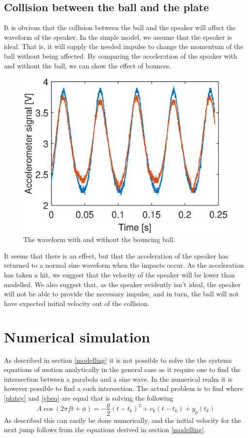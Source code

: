 \documentclass[12pt,oneside,a4paper]{article}
\numberwithin{equation}{section}
\begin{document}
{{{{\subsection{Collision between the ball and the plate}
It is obvious that the collision between the ball and the speaker will affect the waveform of the speaker. In the simple model, we assume that the speaker is ideal. That is, it will supply the needed impulse to change the momentum of the ball without being affected. By comparing the acceleration of the speaker with and without the ball, we can show the effect of bounces. 
\begin{figure}[h]
\centering
\includegraphics[width=\textwidth]{ballanal.eps}
\caption{The waveform with and without the bouncing ball.}
\end{figure}
It seems that there is an effect, but that the acceleration of the speaker has returned to a normal sine waveform when the impacts occur. As the acceleration has taken a hit, we suggest that the velocity of the speaker will be lower than modelled. We also suggest that, as the speaker evidently isn't ideal, the speaker will not be able to provide the necessary impulse, and in turn, the ball will not have expected initial velocity out of the collision. 
\section{Numerical simulation}
As described in section \ref{modelling} it is not possible to solve the the systems equations of motion analytically in the general case as it require one to find the intersection between a parabola and a sine wave. In the numerical realm it is however possible to find a such intersection. The actual problem is to find where \eqref{platey} and \eqref{ybeq} are equal that is solving the following
\begin{equation}
	A \cos(2\pi f t+ \phi) = -\frac{g}{2}(t-t_k)^2+v_k(t-t_k)+y_p(t_k)
\end{equation}
As described this can easily be done numerically, and the initial velocity for the next jump follows from the equations derived in section \ref{modelling}. 
}}}}
\end{document}
